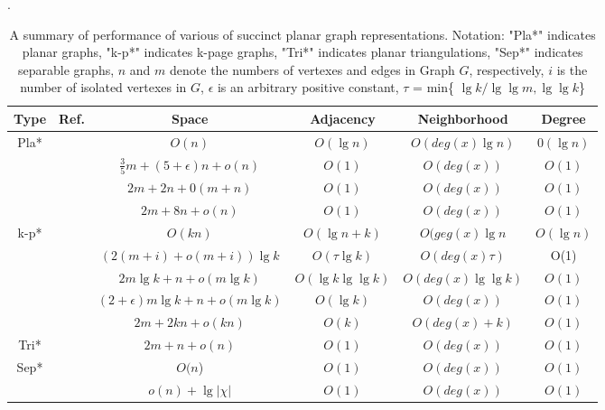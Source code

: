 \documentclass[12pt,glossary]{dalthesis}
\begin{document}
\begin{table}[ht]
\small
\centering
\caption{A summary of performance of various of succinct planar graph representations. Notation: "Pla*" indicates planar graphs, "k-p*" indicates k-page graphs, "Tri*" indicates planar triangulations, "Sep*" indicates separable graphs, $n$ and $m$ denote the numbers of vertexes and edges in Graph $G$, respectively, $i$ is the number of isolated vertexes in $G$, $\epsilon$ is an arbitrary positive constant, $\tau$ = min\{ $\lg k / \lg \lg m, \lg \lg k$\} }. 
\label{my-label}
\begin{tabular}{|c|c|c|c|c|c|}
\hline
Type                       & Ref. & Space & Adjacency & Neighborhood & Degree \\ \hline
\multirow{4}{*}{Pla*}    &  ~\cite{Jacobson}    & $O(n)$ &   $O(\lg n)$   &       $O(deg(x) \lg n)$       &    $0(\lg n)$    \\ \cline{2-6} 
                           &   ~\cite{Chuang} &  $\frac{3}{5} m + (5+ \epsilon )n + o(n) $  & $O(1)$  & $O(deg(x))$ &   $O(1)$     \\ \cline{2-6} 
                           & ~\cite{Chiang} & $2m+2n+0(m+n)$& $O(1)$  &  $O(deg(x))$  &  $O(1)$     \\ \cline{2-6} 
                           & ~\cite{Munro} & $2m+8n+o(n)$&  $O(1)$  &  $O(deg(x))$  &   $O(1)$  \\ \hline
\multirow{5}{*}{k-p*}    &  ~\cite{Jacobson} &  $O(kn)$  & $O(\lg n + k)$  &  $O(geg(x)\lg n$  &  $O(\lg n)$ \\ \cline{2-6} 
                           &   ~\cite{Gavoille}   & $(2(m+i)+o(m+i))\lg k$ & $O(\tau \lg k)$  &  $O(deg(x) \tau)$ & O(1) \\ \cline{2-6} 
                           &  ~\cite{Barbay} & $2m \lg k+n+o(m \lg k)$  & $O(\lg k \lg \lg k)$  & $O(deg(x) \lg \lg k)$ &   $O(1)$  \\ \cline{2-6} 
                           &   ~\cite{Barbay}   & $(2+\epsilon )m\lg k+n+o(m\lg k)$ & $O(\lg k)$ & $O(deg(x))$& $O(1)$        \\ \cline{2-6} 
                           &~\cite{Munro} & $2m+2kn+o(kn)$ & $O(k)$  & $O(deg(x)+k)$ &  $O(1)$  \\ \hline
\multirow{1}{*}{Tri*} &  ~\cite{Chuang}    & $2m+n+o(n)$  & $O(1)$      & $O(deg(x))$    & $O(1)$   \\ \hline
                           
\multirow{2}{*}{Sep*} &  ~\cite{compact-representation}    & $O(n$)  & $O(1)$      & $O(deg(x))$    & $O(1)$   \\ \cline{2-6} 
                           &  ~\cite{succinct-representation}    &  $o(n)+ \lg |\chi|$     & $O(1)$      & $O(deg(x))$    & $O(1)$   \\ \hline
\end{tabular}
\end{table}
\end{document}
